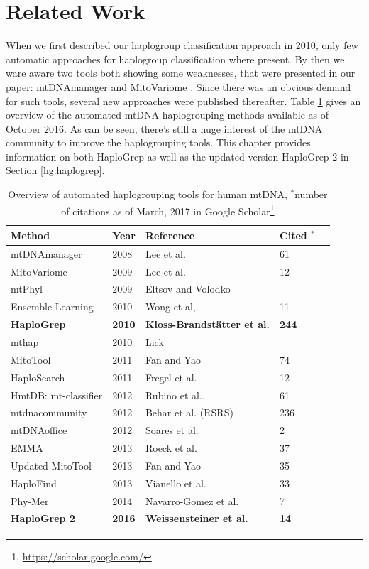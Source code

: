 \section{Related Work}\label{hg:related}
When we first described our haplogroup classification approach in 2010\cite{Kloss-Brandstatter2011}, only few automatic approaches for haplogroup classification where present. By then we ware aware two tools both showing some weaknesses, that were presented in our paper: mtDNAmanager \cite{Lee2008}  and MitoVariome \cite{Lee2009}. Since there was an obvious demand for such tools, several new approaches were published thereafter. Table \ref{table:tools} gives an overview of the automated mtDNA haplogrouping methods available as of October 2016. As can be seen, there's still a huge interest of the mtDNA community to improve the haplogrouping tools. This chapter provides information on both HaploGrep as well as the updated version HaploGrep 2 in Section \ref{hg:haplogrep}.

\begin{table}
  \begin{tabular}{lllll}
    \toprule
    Method  & Year &  Reference & Cited $^*$\\ 
		\midrule
		mtDNAmanager & 2008 & Lee et al. \cite{Lee2008} & 61\\ 
		MitoVariome & 2009  & Lee et al. \cite{Lee2009} & 12\\
		mtPhyl & 2009 &  Eltsov and Volodko \cite{eltsov2009mtphyl} & \\
		Ensemble Learning & 2010 &  Wong et al,. \cite{Wong2011} & 11  \\ 
		\textbf{HaploGrep} & \textbf{2010} & \textbf{Kloss-Brandst{\"a}tter et al.}\cite{Kloss-Brandstatter2011} & \textbf{244}  \\ 
		mthap & 2010 & Lick&\\ 
		MitoTool & 2011 & Fan and Yao \cite{Fan2011} & 74\\
		HaploSearch & 2011 & Fregel et al. \cite{Fregel2011}  & 12 \\
		HmtDB: mt-classifier & 2012 & Rubino et al., \cite{Rubino2012}& 61 \\
		mtdnacommunity & 2012 & Behar et al. \cite{Behar2012} (RSRS) & 236\\
		mtDNAoffice & 2012 & Soares et al. \cite{Soares2012} & 2 \\
		EMMA & 2013 & Roeck et al. \cite{Rock2013} & 37\\
		Updated MitoTool& 2013& Fan and Yao \cite{Fan2013} & 35\\
		HaploFind & 2013 & Vianello et al. \cite{Vianello2013} & 33\\
		Phy-Mer & 2014 & Navarro-Gomez et al. \cite{Navarro-gomez2014} & 7\\
		\textbf{HaploGrep 2} & \textbf{2016} & \textbf{Weissensteiner et al.} \cite{Weissensteiner2016a}  & \textbf{14}\\

		\bottomrule
\end{tabular}
\caption[Related work]{Overview of automated haplogrouping tools for human mtDNA, $^*$number of citations as of March, 2017 in Google Scholar\footnote{\url{https://scholar.google.com/}}}
\label{table:tools}
\end{table}

